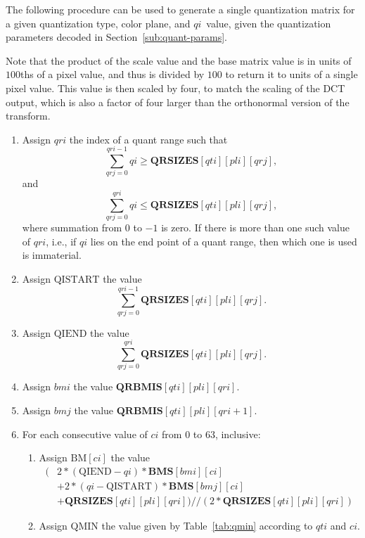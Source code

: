 \documentclass[11pt,letterpaper]{book}
\newcommand{\idx}[1]{{\ensuremath{\mathit{#1}}}}
\newcommand{\qti}{\idx{qti}}
\newcommand{\pli}{\idx{pli}}
\newcommand{\qi}{\idx{qi}}
\newcommand{\ci}{\idx{ci}}
\newcommand{\bmi}{\idx{bmi}}
\newcommand{\bmj}{\idx{bmj}}
\newcommand{\qri}{\idx{qri}}
\newcommand{\qrj}{\idx{qrj}}
\newcommand{\bitvar}[1]{\ensuremath{\mathbf{\bm #1}}}
\newcommand{\locvar}[1]{\ensuremath{\mathrm{#1}}}
\numberwithin{equation}{chapter}
\numberwithin{figure}{chapter}
\numberwithin{table}{chapter}
\begin{document}
The following procedure can be used to generate a single quantization matrix
 for a given quantization type, color plane, and \qi\ value, given the
 quantization parameters decoded in Section~\ref{sub:quant-params}.

Note that the product of the scale value and the base matrix value is in units
 of $100$ths of a pixel value, and thus is divided by $100$ to return it to
 units of a single pixel value.
This value is then scaled by four, to match the scaling of the DCT output,
 which is also a factor of four larger than the orthonormal version of the
 transform.

\begin{enumerate}
\item
Assign \locvar{\qri} the index of a quant range such that
\begin{displaymath}
\sum_{\qrj=0}^{\locvar{\qri}-1}
 \bitvar{\qi} \ge \bitvar{QRSIZES}[\bitvar{\qti}][\bitvar{\pli}][\qrj],
\end{displaymath}
 and
\begin{displaymath}
\sum_{\qrj=0}^{\locvar{\qri}}
 \bitvar{\qi} \le \bitvar{QRSIZES}[\bitvar{\qti}][\bitvar{\pli}][\qrj],
\end{displaymath}
 where summation from $0$ to $-1$ is zero.
If there is more than one such value of $\locvar{\qri}$, i.e., if \bitvar{\qi}
 lies on the end point of a quant range, then which one is used is immaterial.
\item
Assign \locvar{QISTART} the value
\begin{displaymath}
\sum_{\qrj=0}^{\qri-1} \bitvar{QRSIZES}[\bitvar{\qti}][\bitvar{\pli}][\qrj].
\end{displaymath}
\item
Assign \locvar{QIEND} the value
\begin{displaymath}
\sum_{\qrj=0}^{\qri} \bitvar{QRSIZES}[\bitvar{\qti}][\bitvar{\pli}][\qrj].
\end{displaymath}
\item
Assign \locvar{\bmi} the value
 $\bitvar{QRBMIS}[\bitvar{\qti}][\bitvar{\pli}][\qri]$.
\item
Assign \locvar{\bmj} the value
 $\bitvar{QRBMIS}[\bitvar{\qti}][\bitvar{\pli}][\qri+1]$.
\item
For each consecutive value of \locvar{\ci} from $0$ to $63$, inclusive:
\begin{enumerate}
\item
Assign $\locvar{BM}[\locvar{\ci}]$ the value
\begin{displaymath}
\begin{split}
(&2*(\locvar{QIEND}-\bitvar{\qi})*\bitvar{BMS}[\locvar{\bmi}][\locvar{\ci}]\\
 &+2*(\bitvar{\qi}-
   \locvar{QISTART})*\bitvar{BMS}[\locvar{\bmj}][\locvar{\ci}]\\
 &+\bitvar{QRSIZES}[\bitvar{\qti}][\bitvar{\pli}][\locvar{\qri}])//
 (2*\bitvar{QRSIZES}[\bitvar{\qti}][\bitvar{\pli}][\locvar{\qri}])
\end{split}
\end{displaymath}
\item
Assign \locvar{QMIN} the value given by Table~\ref{tab:qmin} according to
 \bitvar{\qti} and \locvar{\ci}.


\end{enumerate}
\end{enumerate}
\end{document}
